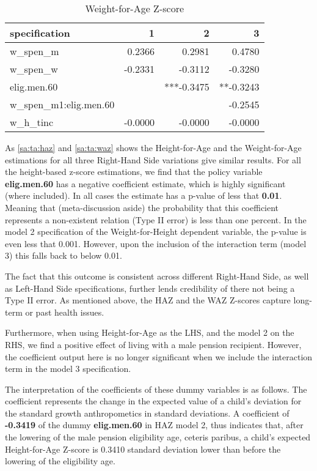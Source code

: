 \begin{refsection}
\begin{table}[!ht]
\centering
\caption{Weight-for-Age Z-score}
\label{sa:ta:waz}
\begin{tabular}{l|rrr}
\hline
specification & 1 & 2 & 3\\
\hline
w\_spen\_m & 0.2366 & 0.2981 & 0.4780 \\
w\_spen\_w & -0.2331 & -0.3112 & -0.3280 \\
elig.men.60 & & ***-0.3475 & **-0.3243 \\
w\_spen\_m1:elig.men.60 & & & -0.2545 \\
w\_h\_tinc & -0.0000 & -0.0000 & -0.0000 \\
\end{tabular}
\end{table}

As \autoref{sa:ta:haz} and \autoref{sa:ta:waz} shows the Height-for-Age and the Weight-for-Age estimations for all three Right-Hand Side variations give similar results.
For all the height-based z-score estimations, we find that the policy variable \textbf{elig.men.60} has a negative coefficient estimate, which is highly significant (where included).
In all cases the estimate has a p-value of less that \textbf{0.01}.
Meaning that (meta-discussion aside) the probability that this coefficient represents a non-existent relation (Type II error) is less than one percent.
In the model 2 specification of the Weight-for-Height dependent variable, the p-value is even less that 0.001.
However, upon the inclusion of the interaction term (model 3) this falls back to below 0.01.

The fact that this outcome is consistent across different Right-Hand Side,
as well as Left-Hand Side specifications, further lends credibility of there not being a Type II error.
As mentioned above, the HAZ and the WAZ Z-scores capture long-term or past health issues.

Furthermore, when using Height-for-Age as the LHS, and the model 2 on the RHS,
we find a positive effect of living with a male pension recipient.
However, the coefficient output here is no longer significant when we include the interaction term in the model 3 specification.

The interpretation of the coefficients of these dummy variables is as follows.
The coefficient represents the change in the expected value of a child's deviation for the standard growth anthropometics in standard deviations. 
A coefficient of \textbf{-0.3419} of the dummy \textbf{elig.men.60} in HAZ model 2,  thus indicates that,
after the lowering of the male pension eligibility age, ceteris paribus, a child's expected Height-for-Age Z-score is 0.3410 standard deviation lower than before the lowering of the eligibility age.




\end{refsection}
